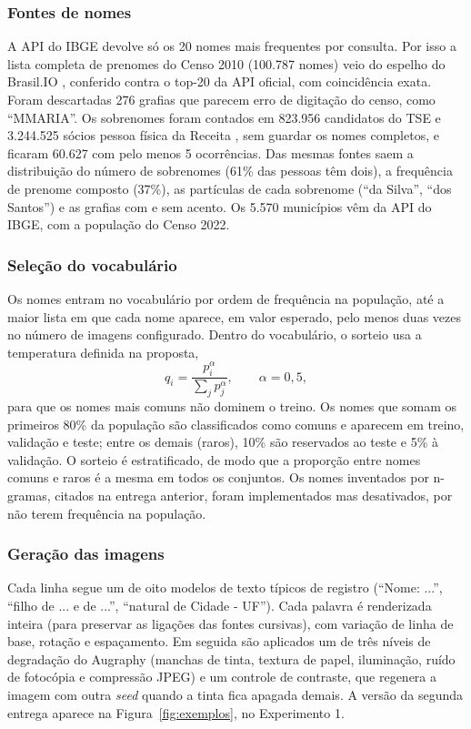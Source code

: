 \documentclass[12pt,a4paper]{article}
\begin{document}
\subsubsection{Fontes de nomes}
A API do IBGE devolve só os 20 nomes mais frequentes por consulta. Por isso a lista completa de prenomes do Censo 2010 (100.787 nomes) veio do espelho do Brasil.IO \cite{brasilio_nomes}, conferido contra o top-20 da API oficial, com coincidência exata. Foram descartadas 276 grafias que parecem erro de digitação do censo, como ``MMARIA''. Os sobrenomes foram contados em 823.956 candidatos do TSE \cite{tse_eleitorado} e 3.244.525 sócios pessoa física da Receita \cite{rfb_socios}, sem guardar os nomes completos, e ficaram 60.627 com pelo menos 5 ocorrências. Das mesmas fontes saem a distribuição do número de sobrenomes (61\% das pessoas têm dois), a frequência de prenome composto (37\%), as partículas de cada sobrenome (``da Silva'', ``dos Santos'') e as grafias com e sem acento. Os 5.570 municípios vêm da API do IBGE, com a população do Censo 2022.

\subsubsection{Seleção do vocabulário}
Os nomes entram no vocabulário por ordem de frequência na população, até a maior lista em que cada nome aparece, em valor esperado, pelo menos duas vezes no número de imagens configurado. Dentro do vocabulário, o sorteio usa a temperatura definida na proposta,
\[
q_i = \frac{p_i^{\alpha}}{\sum_j p_j^{\alpha}}, \qquad \alpha = 0{,}5,
\]
para que os nomes mais comuns não dominem o treino. Os nomes que somam os primeiros 80\% da população são classificados como comuns e aparecem em treino, validação e teste; entre os demais (raros), 10\% são reservados ao teste e 5\% à validação. O sorteio é estratificado, de modo que a proporção entre nomes comuns e raros é a mesma em todos os conjuntos. Os nomes inventados por n-gramas, citados na entrega anterior, foram implementados mas desativados, por não terem frequência na população.

\subsubsection{Geração das imagens}
Cada linha segue um de oito modelos de texto típicos de registro (``Nome: ...'', ``filho de ... e de ...'', ``natural de Cidade - UF''). Cada palavra é renderizada inteira (para preservar as ligações das fontes cursivas), com variação de linha de base, rotação e espaçamento. Em seguida são aplicados um de três níveis de degradação do Augraphy (manchas de tinta, textura de papel, iluminação, ruído de fotocópia e compressão JPEG) e um controle de contraste, que regenera a imagem com outra \emph{seed} quando a tinta fica apagada demais. A versão da segunda entrega aparece na Figura~\ref{fig:exemplos}, no Experimento 1.
\end{document}
